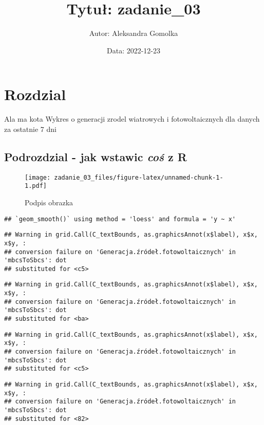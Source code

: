 \documentclass[
]{article}
\title{Tytuł: zadanie\_03}
\author{Autor: Aleksandra Gomolka}
\date{Data: 2022-12-23}
\begin{document}
\maketitle

\hypertarget{rozdzial}{%
\section{Rozdzial}\label{rozdzial}}

Ala ma kota Wykres o generacji zrodel wiatrowych i fotowoltaicznych dla
danych za ostatnie 7 dni

\hypertarget{podrozdzial---jak-wstawic-coux15b-z-r}{%
\subsection{\texorpdfstring{Podrozdzial - jak wstawic \emph{coś} z
\textbf{R}}{Podrozdzial - jak wstawic coś z R}}\label{podrozdzial---jak-wstawic-coux15b-z-r}}

\begin{figure}
\centering
\texttt{[image: zadanie\_03\_files/figure-latex/unnamed-chunk-1-1.pdf]}
\caption{Podpis obrazka}
\end{figure}

\begin{verbatim}
## `geom_smooth()` using method = 'loess' and formula = 'y ~ x'
\end{verbatim}

\begin{verbatim}
## Warning in grid.Call(C_textBounds, as.graphicsAnnot(x$label), x$x, x$y, :
## conversion failure on 'Generacja.źródeł.fotowoltaicznych' in 'mbcsToSbcs': dot
## substituted for <c5>
\end{verbatim}

\begin{verbatim}
## Warning in grid.Call(C_textBounds, as.graphicsAnnot(x$label), x$x, x$y, :
## conversion failure on 'Generacja.źródeł.fotowoltaicznych' in 'mbcsToSbcs': dot
## substituted for <ba>
\end{verbatim}

\begin{verbatim}
## Warning in grid.Call(C_textBounds, as.graphicsAnnot(x$label), x$x, x$y, :
## conversion failure on 'Generacja.źródeł.fotowoltaicznych' in 'mbcsToSbcs': dot
## substituted for <c5>
\end{verbatim}

\begin{verbatim}
## Warning in grid.Call(C_textBounds, as.graphicsAnnot(x$label), x$x, x$y, :
## conversion failure on 'Generacja.źródeł.fotowoltaicznych' in 'mbcsToSbcs': dot
## substituted for <82>
\end{verbatim}
\end{document}
